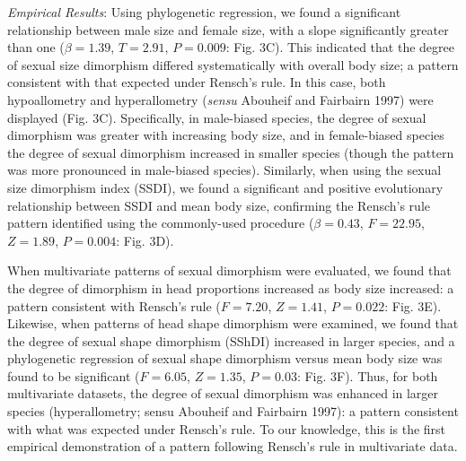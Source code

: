 \documentclass[]{article}
\begin{document}
\emph{Empirical Results}: Using phylogenetic regression, we found a
significant relationship between male size and female size, with a slope
significantly greater than one (\(\beta = 1.39\), \(T=2.91\),
\(P = 0.009\): Fig. 3C). This indicated that the degree of sexual size
dimorphism differed systematically with overall body size; a pattern
consistent with that expected under Rensch's rule. In this case, both
hypoallometry and hyperallometry (\emph{sensu} Abouheif and Fairbairn
1997) were displayed (Fig. 3C). Specifically, in male-biased species,
the degree of sexual dimorphism was greater with increasing body size,
and in female-biased species the degree of sexual dimorphism increased
in smaller species (though the pattern was more pronounced in
male-biased species). Similarly, when using the sexual size dimorphism
index (SSDI), we found a significant and positive evolutionary
relationship between SSDI and mean body size, confirming the Rensch's
rule pattern identified using the commonly-used procedure
(\(\beta = 0.43\), \(F=22.95\), \(Z=1.89\), \(P = 0.004\): Fig. 3D).
\hfill\break

When multivariate patterns of sexual dimorphism were evaluated, we found
that the degree of dimorphism in head proportions increased as body size
increased: a pattern consistent with Rensch's rule (\(F=7.20\),
\(Z=1.41\), \(P = 0.022\): Fig. 3E). Likewise, when patterns of head
shape dimorphism were examined, we found that the degree of sexual shape
dimorphism (SShDI) increased in larger species, and a phylogenetic
regression of sexual shape dimorphism versus mean body size was found to
be significant (\(F=6.05\), \(Z=1.35\), \(P = 0.03\): Fig. 3F). Thus,
for both multivariate datasets, the degree of sexual dimorphism was
enhanced in larger species (hyperallometry; sensu Abouheif and Fairbairn
1997): a pattern consistent with what was expected under Rensch's rule.
To our knowledge, this is the first empirical demonstration of a pattern
following Rensch's rule in multivariate data. \hfill\break
\end{document}
